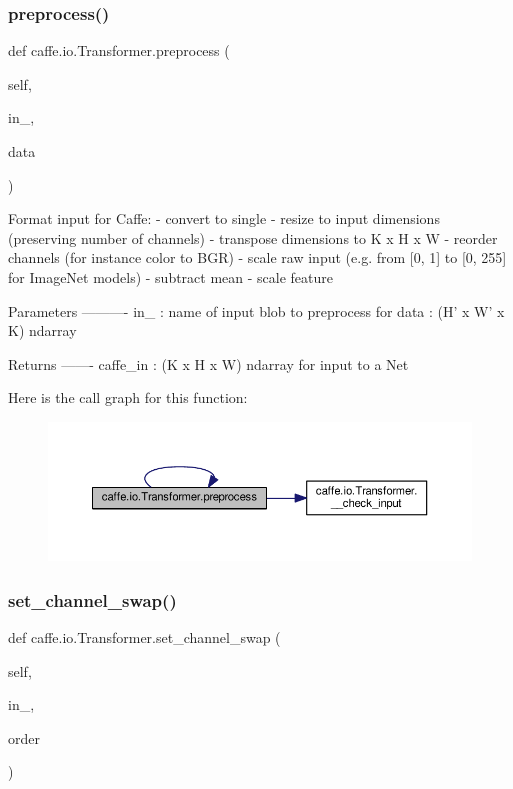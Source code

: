 \subsubsection{\texorpdfstring{preprocess()}{preprocess()}\hspace{0.1cm}{\footnotesize\ttfamily [2/2]}}
{\footnotesize\ttfamily def caffe.\+io.\+Transformer.\+preprocess (\begin{DoxyParamCaption}\item[{}]{self,  }\item[{}]{in\+\_\+,  }\item[{}]{data }\end{DoxyParamCaption})}

\begin{DoxyVerb}Format input for Caffe:
- convert to single
- resize to input dimensions (preserving number of channels)
- transpose dimensions to K x H x W
- reorder channels (for instance color to BGR)
- scale raw input (e.g. from [0, 1] to [0, 255] for ImageNet models)
- subtract mean
- scale feature

Parameters
----------
in_ : name of input blob to preprocess for
data : (H' x W' x K) ndarray

Returns
-------
caffe_in : (K x H x W) ndarray for input to a Net
\end{DoxyVerb}
 Here is the call graph for this function\+:
\nopagebreak
\begin{figure}[H]
\begin{center}
\leavevmode
\includegraphics[width=350pt]{classcaffe_1_1io_1_1_transformer_a0b2d73743d661b36853fe3d963bd5fbb_cgraph}
\end{center}
\end{figure}
\mbox{\label{classcaffe_1_1io_1_1_transformer_abd32a70aebb66e66de7567800547b114}} 
\subsubsection{\texorpdfstring{set\+\_\+channel\+\_\+swap()}{set\_channel\_swap()}\hspace{0.1cm}{\footnotesize\ttfamily [1/2]}}
{\footnotesize\ttfamily def caffe.\+io.\+Transformer.\+set\+\_\+channel\+\_\+swap (\begin{DoxyParamCaption}\item[{}]{self,  }\item[{}]{in\+\_\+,  }\item[{}]{order }\end{DoxyParamCaption})}

